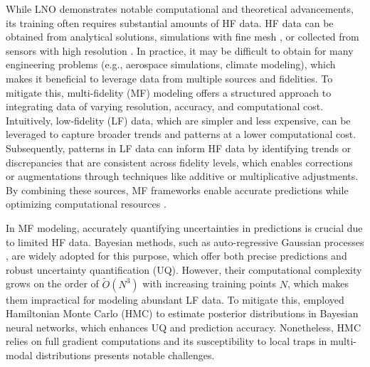While LNO demonstrates notable computational and theoretical advancements, its training often requires substantial amounts of HF data. HF data can be obtained from analytical solutions, simulations with fine mesh \citep{lu2020extraction, lu2022multifidelity}, or collected from sensors with high resolution \citep{fernandez2016review}. In practice, it may be difficult to obtain for many engineering problems (e.g., aerospace simulations, climate modeling), which makes it beneficial to leverage data from multiple sources and fidelities. To mitigate this, multi-fidelity (MF) modeling offers a structured approach to integrating data of varying resolution, accuracy, and computational cost. Intuitively, low-fidelity (LF) data, which are simpler and less expensive, can be leveraged to capture broader trends and patterns at a lower computational cost. Subsequently, patterns in LF data can inform HF data by identifying trends or discrepancies that are consistent across fidelity levels, which enables corrections or augmentations through techniques like additive or multiplicative adjustments. By combining these sources, MF frameworks enable accurate predictions while optimizing computational resources \citep{meng2020composite, howard2023multifidelity}. 

In MF modeling, accurately quantifying uncertainties in predictions is crucial due to limited HF data. Bayesian methods, such as auto-regressive Gaussian processes \citep{williams1995gaussian, pang2019neural}, are widely adopted for this purpose, which offer both precise predictions and robust uncertainty quantification (UQ). However, their computational complexity grows on the order of $\tilde{O}(N^3)$ with increasing training points $N$, which makes them impractical for modeling abundant LF data. To mitigate this, \citet{meng2021multi} employed Hamiltonian Monte Carlo (HMC) \citep{neal2011mcmc, tanqi2014stochastic, hoffman2014no} to estimate posterior distributions in Bayesian neural networks, which enhances UQ and prediction accuracy. Nonetheless, HMC relies on full gradient computations and its susceptibility to local traps in multi-modal distributions presents notable challenges.

